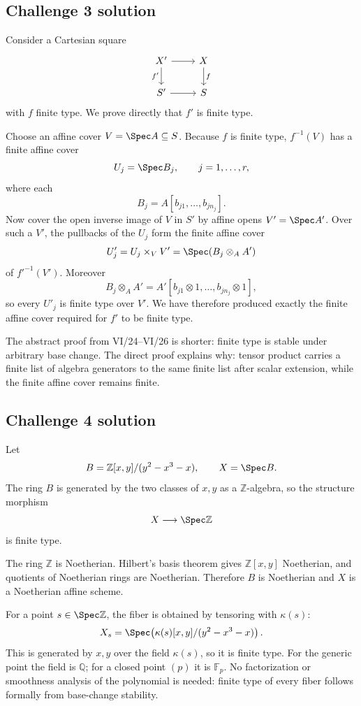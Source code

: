 \subsection*{Challenge 3 solution}
\begin{solution}
Consider a Cartesian square
\[
\begin{tikzcd}
X' \arrow[r] \arrow[d,"f'"'] & X \arrow[d,"f"]\\
S' \arrow[r] & S
\end{tikzcd}
\]
with \(f\) finite type.  We prove directly that \(f'\) is finite type.

Choose an affine cover \(V=\Spec A\subseteq S\).  Because \(f\) is finite type,
\(f^{-1}(V)\) has a finite affine cover
\[
U_j=\Spec B_j,\qquad j=1,\ldots,r,
\]
where each
\[
B_j=A[b_{j1},\ldots,b_{jn_j}].
\]
Now cover the open inverse image of \(V\) in \(S'\) by affine opens
\(V'=\Spec A'\).  Over such a \(V'\), the pullbacks of the \(U_j\) form the finite affine cover
\[
U'_j=U_j\times_VV'
=
\Spec(B_j\otimes_AA')
\]
of \(f'^{-1}(V')\).  Moreover
\[
B_j\otimes_AA'
=
A'[b_{j1}\otimes1,\ldots,b_{jn_j}\otimes1],
\]
so every \(U'_j\) is finite type over \(V'\).  We have therefore produced exactly the finite affine
cover required for \(f'\) to be finite type.

The abstract proof from VI/24–VI/26 is shorter: finite type is stable under arbitrary base change.
The direct proof explains why: tensor product carries a finite list of algebra generators to the
same finite list after scalar extension, while the finite affine cover remains finite.
\end{solution}

\subsection*{Challenge 4 solution}
\begin{solution}
Let
\[
B=\mathbb Z[x,y]/(y^2-x^3-x),
\qquad
X=\Spec B.
\]
The ring \(B\) is generated by the two classes of \(x,y\) as a \(\mathbb Z\)-algebra, so the
structure morphism
\[
X\longrightarrow\Spec\mathbb Z
\]
is finite type.

The ring \(\mathbb Z\) is Noetherian.  Hilbert's basis theorem gives
\(\mathbb Z[x,y]\) Noetherian, and quotients of Noetherian rings are Noetherian.  Therefore \(B\)
is Noetherian and \(X\) is a Noetherian affine scheme.

For a point \(s\in\Spec\mathbb Z\), the fiber is obtained by tensoring with \(\kappa(s)\):
\[
X_s
=
\Spec\!\left(
\kappa(s)[x,y]/(y^2-x^3-x)
\right).
\]
This is generated by \(x,y\) over the field \(\kappa(s)\), so it is finite type.  For the generic
point the field is \(\mathbb Q\); for a closed point \((p)\) it is \(\mathbb F_p\).  No
factorization or smoothness analysis of the polynomial is needed: finite type of every fiber follows
formally from base-change stability.
\end{solution}


